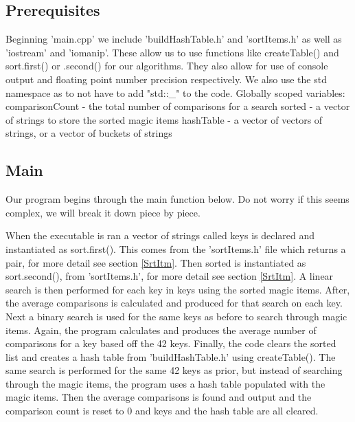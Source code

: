 \documentclass[12pt, letterpaper]{article}
\begin{document}
\subsection{Prerequisites} \label{Prereq}

Beginning 'main.cpp' we include 'buildHashTable.h' and 'sortItems.h' as well as 'iostream' and 'iomanip'.
These allow us to use functions like createTable() and sort.first() or .second() for our algorithms.
They also allow for use of console output and floating point number precision respectively. 
We also use the std namespace as to not have to add "std::\_" to the code.
\newline
\newline
Globally scoped variables:
\newline
\indent comparisonCount - the total number of comparisons for a search
\newline
\indent sorted - a vector of strings to store the sorted magic items
\newline
\indent hashTable - a vector of vectors of strings, or a vector of buckets of strings

\subsection{Main} \label{Main}
Our program begins through the main function below.
Do not worry if this seems complex, we will break it down piece by piece.

When the executable is ran a vector of strings called keys is declared and instantiated as sort.first().
This comes from the 'sortItems.h' file which returns a pair, for more detail see section \ref{SrtItm}.
Then sorted is instantiated as sort.second(), from 'sortItems.h', for more detail see section \ref{SrtItm}.
\indent A linear search is then performed for each key in keys using the sorted magic items.
After, the average comparisons is calculated and produced for that search on each key.
Next a binary search is used for the same keys as before to search through magic items.
Again, the program calculates and produces the average number of comparisons for a key based off the 42 keys.
\newline
\indent Finally, the code clears the sorted list and creates a hash table from 'buildHashTable.h' using createTable().
The same search is performed for the same 42 keys as prior, but instead of searching through the magic items, the program uses a hash table populated with the magic items.
Then the average comparisons is found and output and the comparison count is reset to 0 and keys and the hash table are all cleared.
\end{document}
